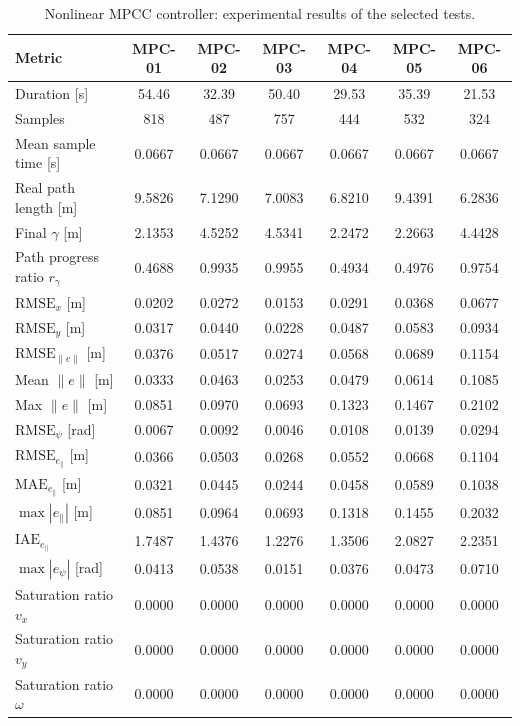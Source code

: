 \begin{table}[H]
\centering
\caption{Nonlinear MPCC controller: experimental results of the selected tests.}
\label{tab:mpcc_experimental_results}
\scriptsize
\setlength{\tabcolsep}{4pt}
\renewcommand{\arraystretch}{0.90}
\begin{tabular}{lcccccc}
\toprule
\textbf{Metric} &
\textbf{MPC-01} &
\textbf{MPC-02} &
\textbf{MPC-03} &
\textbf{MPC-04} &
\textbf{MPC-05} &
\textbf{MPC-06} \\
\midrule
Duration [s] & 54.46 & 32.39 & 50.40 & 29.53 & 35.39 & 21.53 \\
Samples & 818 & 487 & 757 & 444 & 532 & 324 \\
Mean sample time [s] & 0.0667 & 0.0667 & 0.0667 & 0.0667 & 0.0667 & 0.0667 \\
Real path length [m] & 9.5826 & 7.1290 & 7.0083 & 6.8210 & 9.4391 & 6.2836 \\
Final \(\gamma\) [m] & 2.1353 & 4.5252 & 4.5341 & 2.2472 & 2.2663 & 4.4428 \\
Path progress ratio \(r_{\gamma}\) & 0.4688 & 0.9935 & 0.9955 & 0.4934 & 0.4976 & 0.9754 \\
\(\mathrm{RMSE}_x\) [m] & 0.0202 & 0.0272 & 0.0153 & 0.0291 & 0.0368 & 0.0677 \\
\(\mathrm{RMSE}_y\) [m] & 0.0317 & 0.0440 & 0.0228 & 0.0487 & 0.0583 & 0.0934 \\
\(\mathrm{RMSE}_{\|e\|}\) [m] & 0.0376 & 0.0517 & 0.0274 & 0.0568 & 0.0689 & 0.1154 \\
Mean \(\|e\|\) [m] & 0.0333 & 0.0463 & 0.0253 & 0.0479 & 0.0614 & 0.1085 \\
Max \(\|e\|\) [m] & 0.0851 & 0.0970 & 0.0693 & 0.1323 & 0.1467 & 0.2102 \\
\(\mathrm{RMSE}_{\psi}\) [rad] & 0.0067 & 0.0092 & 0.0046 & 0.0108 & 0.0139 & 0.0294 \\
\(\mathrm{RMSE}_{e_{\parallel}}\) [m] & 0.0366 & 0.0503 & 0.0268 & 0.0552 & 0.0668 & 0.1104 \\
\(\mathrm{MAE}_{e_{\parallel}}\) [m] & 0.0321 & 0.0445 & 0.0244 & 0.0458 & 0.0589 & 0.1038 \\
\(\max |e_{\parallel}|\) [m] & 0.0851 & 0.0964 & 0.0693 & 0.1318 & 0.1455 & 0.2032 \\
\(\mathrm{IAE}_{e_{\parallel}}\) & 1.7487 & 1.4376 & 1.2276 & 1.3506 & 2.0827 & 2.2351 \\
\(\max |e_{\psi}|\) [rad] & 0.0413 & 0.0538 & 0.0151 & 0.0376 & 0.0473 & 0.0710 \\
Saturation ratio \(v_x\) & 0.0000 & 0.0000 & 0.0000 & 0.0000 & 0.0000 & 0.0000 \\
Saturation ratio \(v_y\) & 0.0000 & 0.0000 & 0.0000 & 0.0000 & 0.0000 & 0.0000 \\
Saturation ratio \(\omega\) & 0.0000 & 0.0000 & 0.0000 & 0.0000 & 0.0000 & 0.0000 \\
\bottomrule
\end{tabular}
\end{table}

